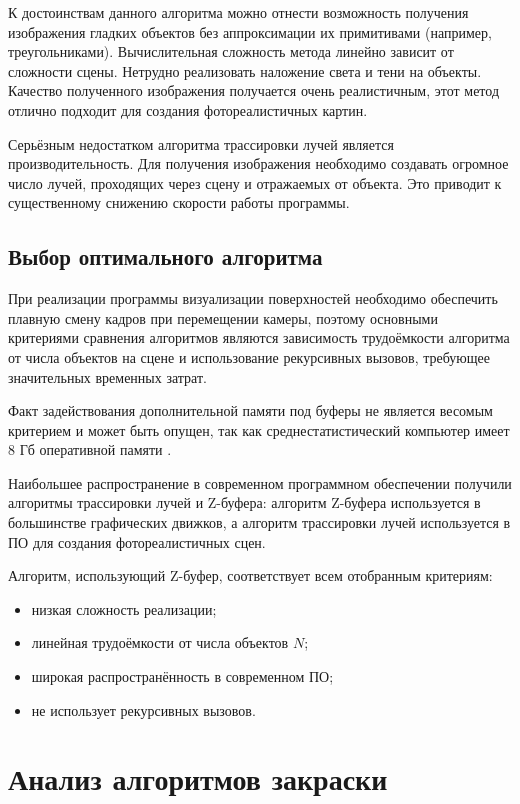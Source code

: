 
К достоинствам данного алгоритма можно отнести возможность получения изображения гладких объектов без аппроксимации их примитивами (например, треугольниками).
Вычислительная сложность метода линейно зависит от сложности сцены.
Нетрудно реализовать наложение света и тени на объекты.
Качество полученного изображения получается очень реалистичным, этот метод отлично подходит для создания фотореалистичных картин.

Серьёзным недостатком алгоритма трассировки лучей является производительность.
Для получения изображения необходимо создавать огромное число лучей, проходящих через сцену и отражаемых от объекта.
Это приводит к существенному снижению скорости работы программы.

\subsection{Выбор оптимального алгоритма}

При реализации программы визуализации поверхностей необходимо обеспечить плавную смену кадров при перемещении камеры, поэтому основными критериями сравнения алгоритмов являются зависимость трудоёмкости алгоритма от числа объектов на сцене и использование рекурсивных вызовов, требующее значительных временных затрат.

Факт задействования дополнительной памяти под буферы не является весомым критерием и может быть опущен, так как среднестатистический компьютер имеет 8 Гб оперативной памяти \cite{steam}.

Наибольшее распространение в современном программном обеспечении получили алгоритмы трассировки лучей и Z-буфера: алгоритм Z-буфера используется в большинстве графических движков, а алгоритм трассировки лучей используется в ПО для создания фотореалистичных сцен.

Алгоритм, использующий Z-буфер, соответствует всем отобранным критериям:
\begin{itemize}
	\item низкая сложность реализации;
	\item линейная трудоёмкости от числа объектов $N$;
	\item широкая распространённость в современном ПО;
	\item не использует рекурсивных вызовов.
\end{itemize}

\section{Анализ алгоритмов закраски}

